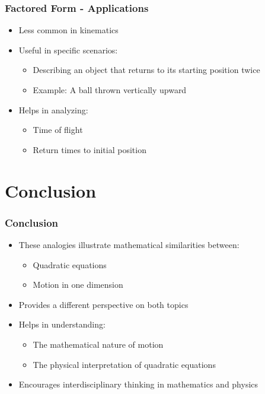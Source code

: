 \documentclass{beamer}
\begin{document}
\begin{frame}
\frametitle{Factored Form - Applications}
\begin{itemize}
    \item Less common in kinematics
    \item Useful in specific scenarios:
    \begin{itemize}
        \item Describing an object that returns to its starting position twice
        \item Example: A ball thrown vertically upward
    \end{itemize}
    \item Helps in analyzing:
    \begin{itemize}
        \item Time of flight
        \item Return times to initial position
    \end{itemize}
\end{itemize}
\end{frame}

\section{Conclusion}

\begin{frame}
\frametitle{Conclusion}
\begin{itemize}
    \item These analogies illustrate mathematical similarities between:
    \begin{itemize}
        \item Quadratic equations
        \item Motion in one dimension
    \end{itemize}
    \item Provides a different perspective on both topics
    \item Helps in understanding:
    \begin{itemize}
        \item The mathematical nature of motion
        \item The physical interpretation of quadratic equations
    \end{itemize}
    \item Encourages interdisciplinary thinking in mathematics and physics
\end{itemize}
\end{frame}
\end{document}
